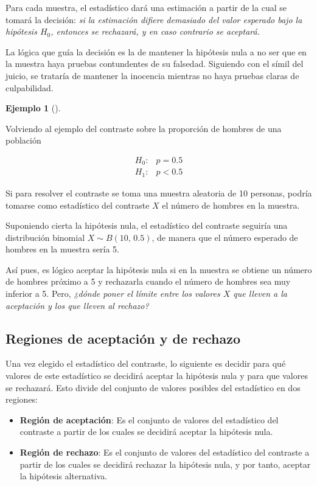 \documentclass[
  a4paper,
]{scrreport}
\theoremstyle{plain}
\theoremstyle{definition}
\theoremstyle{definition}
\newtheorem{example}{Ejemplo}[chapter]
\theoremstyle{remark}
\begin{document}
Para cada muestra, el estadístico dará una estimación a partir de la
cual se tomará la decisión: \emph{si la estimación difiere demasiado del
valor esperado bajo la hipótesis \(H_0\), entonces se rechazará, y en
caso contrario se aceptará.}

La lógica que guía la decisión es la de mantener la hipótesis nula a no
ser que en la muestra haya pruebas contundentes de su falsedad.
Siguiendo con el símil del juicio, se trataría de mantener la inocencia
mientras no haya pruebas claras de culpabilidad.

\begin{example}[]\protect\hypertarget{exm-estadistico-contraste}{}\label{exm-estadistico-contraste}

Volviendo al ejemplo del contraste sobre la proporción de hombres de una
población

\begin{align*}
H_0: & p=0.5 \\
H_1: & p<0.5
\end{align*}

Si para resolver el contraste se toma una muestra aleatoria de 10
personas, podría tomarse como estadístico del contraste \(X\) el número
de hombres en la muestra.

Suponiendo cierta la hipótesis nula, el estadístico del contraste
seguiría una distribución binomial \(X\sim B(10,\,0.5)\), de manera que
el número esperado de hombres en la muestra sería 5.

Así pues, es lógico aceptar la hipótesis nula si en la muestra se
obtiene un número de hombres próximo a 5 y rechazarla cuando el número
de hombres sea muy inferior a 5. Pero, \emph{¿dónde poner el límite
entre los valores \(X\) que lleven a la aceptación y los que lleven al
rechazo?}

\end{example}

\subsection{Regiones de aceptación y de
rechazo}\label{regiones-de-aceptaciuxf3n-y-de-rechazo}

Una vez elegido el estadístico del contraste, lo siguiente es decidir
para qué valores de este estadístico se decidirá aceptar la hipótesis
nula y para que valores se rechazará. Esto divide del conjunto de
valores posibles del estadístico en dos regiones:

\begin{itemize}
\item
  \textbf{Región de aceptación}: Es el conjunto de valores del
  estadístico del contraste a partir de los cuales se decidirá aceptar
  la hipótesis nula.
\item
  \textbf{Región de rechazo}: Es el conjunto de valores del estadístico
  del contraste a partir de los cuales se decidirá rechazar la hipótesis
  nula, y por tanto, aceptar la hipótesis alternativa.
\end{itemize}
\end{document}
